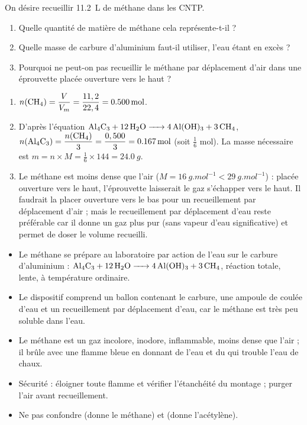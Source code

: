 \documentclass[11pt]{article}
\begin{document}
\begin{exercice}
On désire recueillir \SI{11,2}{L} de méthane dans les CNTP.
\begin{enumerate}
\item Quelle quantité de matière de méthane cela représente-t-il ?
\item Quelle masse de carbure d'aluminium faut-il utiliser, l'eau étant en excès ?
\item Pourquoi ne peut-on pas recueillir le méthane par déplacement d'air dans une éprouvette placée ouverture vers le haut ?
\end{enumerate}
\end{exercice}

\begin{corrige}[Exercice]
\begin{enumerate}
\item $n(\ce{CH4}) = \dfrac{V}{V_m} = \dfrac{11,2}{22,4} = \SI{0,500}{mol}$.
\item D'après l'équation $\ce{Al4C3 + 12 H2O -> 4 Al(OH)3 + 3 CH4}$, $n(\ce{Al4C3}) = \dfrac{n(\ce{CH4})}{3} = \dfrac{0,500}{3} = \SI{0,167}{mol}$ (soit $\frac{1}{6}$ mol). La masse nécessaire est $m = n \times M = \frac{1}{6} \times 144 = \SI{24,0}{g}$.
\item Le méthane est moins dense que l'air ($M = \SI{16}{g.mol^{-1}} < \SI{29}{g.mol^{-1}}$) : placée ouverture vers le haut, l'éprouvette laisserait le gaz s'échapper vers le haut. Il faudrait la placer ouverture vers le bas pour un recueillement par déplacement d'air ; mais le recueillement par déplacement d'eau reste préférable car il donne un gaz plus pur (sans vapeur d'eau significative) et permet de doser le volume recueilli.
\end{enumerate}
\end{corrige}

\begin{aretenir}
\begin{itemize}
\item Le méthane se prépare au laboratoire par action de l'eau sur le carbure d'aluminium : $\ce{Al4C3 + 12 H2O -> 4 Al(OH)3 + 3 CH4}$, réaction totale, lente, à température ordinaire.
\item Le dispositif comprend un ballon contenant le carbure, une ampoule de coulée d'eau et un recueillement par déplacement d'eau, car le méthane est très peu soluble dans l'eau.
\item Le méthane est un gaz incolore, inodore, inflammable, moins dense que l'air ; il brûle avec une flamme bleue en donnant de l'eau et du  qui trouble l'eau de chaux.
\item Sécurité : éloigner toute flamme et vérifier l'étanchéité du montage ; purger l'air avant recueillement.
\item Ne pas confondre  (donne le méthane) et  (donne l'acétylène).
\end{itemize}
\end{aretenir}
\end{document}

